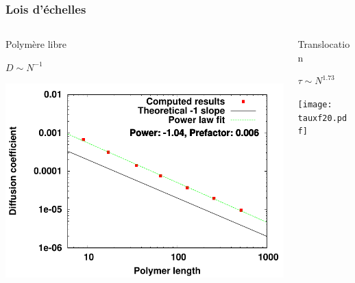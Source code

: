 \documentclass{beamer}
\begin{document}
\frame
{
  \frametitle{Lois d'échelles}
  
  \begin{columns}
  \begin{column}{0.5\textwidth}
\begin{center}
Polymère libre

$D \sim N^{-1} $
\medskip

\includegraphics[width=1.15\textwidth]{diffusioncoefficient.pdf}
\end{center}

\end{column}

\begin{column}{0.5\textwidth}
  
\begin{center}
Translocation

$\tau \sim N^{1.73} $
\medskip


\texttt{[image: tauxf20.pdf]}
\end{center}
\end{column}
\end{columns}
}
\end{document}
